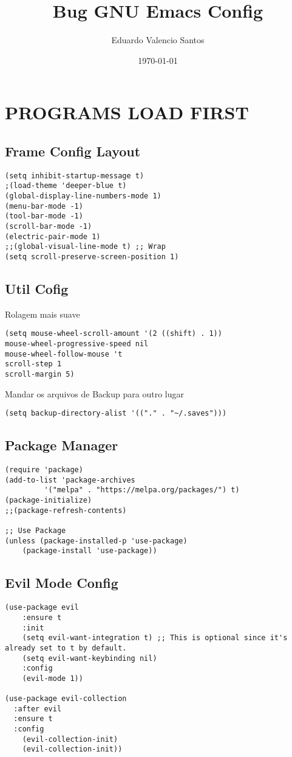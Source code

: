\documentclass[11pt]{article}
\author{Eduardo Valencio Santos}
\date{\today}
\title{Bug GNU Emacs Config}
\begin{document}
\maketitle
\setcounter{tocdepth}{2}
\tableofcontents


\section{PROGRAMS LOAD FIRST}
\label{sec:org1a1e065}
\subsection{Frame Config Layout}
\label{sec:orga33a77f}
\begin{verbatim}
(setq inhibit-startup-message t)
;(load-theme 'deeper-blue t)
(global-display-line-numbers-mode 1)
(menu-bar-mode -1)
(tool-bar-mode -1)
(scroll-bar-mode -1)
(electric-pair-mode 1)
;;(global-visual-line-mode t) ;; Wrap
(setq scroll-preserve-screen-position 1)
\end{verbatim}
\subsection{Util Cofig}
\label{sec:orgd80c75f}
Rolagem mais suave
\begin{verbatim}
(setq mouse-wheel-scroll-amount '(2 ((shift) . 1))
mouse-wheel-progressive-speed nil
mouse-wheel-follow-mouse 't
scroll-step 1
scroll-margin 5)
\end{verbatim}

Mandar os arquivos de Backup para outro lugar
\begin{verbatim}
(setq backup-directory-alist '(("." . "~/.saves")))
\end{verbatim}

\subsection{Package Manager}
\label{sec:orga18016a}
\begin{verbatim}
(require 'package)
(add-to-list 'package-archives
	     '("melpa" . "https://melpa.org/packages/") t)
(package-initialize)
;;(package-refresh-contents)

;; Use Package
(unless (package-installed-p 'use-package)
    (package-install 'use-package))
\end{verbatim}

\subsection{Evil Mode Config}
\label{sec:org6fd0be5}
\begin{verbatim}
(use-package evil
    :ensure t
    :init
    (setq evil-want-integration t) ;; This is optional since it's already set to t by default.
    (setq evil-want-keybinding nil)
    :config
	(evil-mode 1))

(use-package evil-collection
  :after evil
  :ensure t
  :config
    (evil-collection-init)
    (evil-collection-init))
\end{verbatim}
\end{document}
